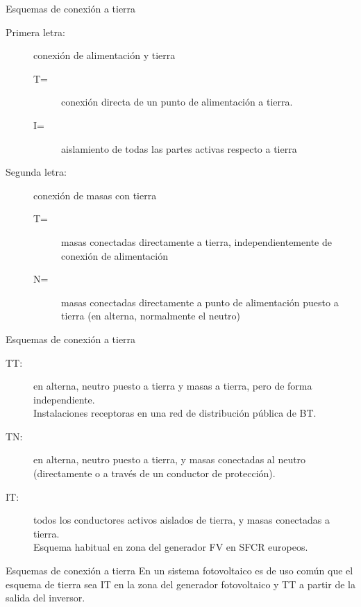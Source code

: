 \documentclass[xcolor={usenames,svgnames,dvipsnames}]{beamer}
\begin{document}
\begin{frame}[label=sec-1-0-8]{Esquemas de conexión a tierra}
\begin{description}
\item[{Primera letra:}] conexión de alimentación y tierra

\begin{description}
\item[{T=}] conexión directa de un punto de alimentación a tierra.

\item[{I=}] aislamiento de todas las partes activas respecto a tierra
\end{description}

\item[{Segunda letra:}] conexión de masas con tierra

\begin{description}
\item[{T=}] masas conectadas directamente a tierra, independientemente
de conexión de alimentación

\item[{N=}] masas conectadas directamente a punto de alimentación puesto
a tierra (en alterna, normalmente el neutro)
\end{description}
\end{description}
\end{frame}

\begin{frame}[label=sec-1-0-9]{Esquemas de conexión a tierra}
\begin{description}
\item[{TT:}] en alterna, neutro puesto a tierra y masas a tierra, pero de
forma independiente.\\
   Instalaciones receptoras en una red de distribución pública de BT.

\item[{TN:}] en alterna, neutro puesto a tierra, y masas conectadas al
neutro (directamente o a través de un conductor de protección).

\item[{IT:}] todos los conductores activos aislados de tierra, y masas
conectadas a tierra.\\
   Esquema habitual en zona del generador FV en SFCR europeos.
\end{description}
\end{frame}

\begin{frame}[label=sec-1-0-10]{Esquemas de conexión a tierra}
En un sistema fotovoltaico es de uso común que el esquema de tierra sea
\alert{IT en la zona del generador fotovoltaico} y \alert{TT a partir de la salida
del inversor}.
\end{frame}
\end{document}
